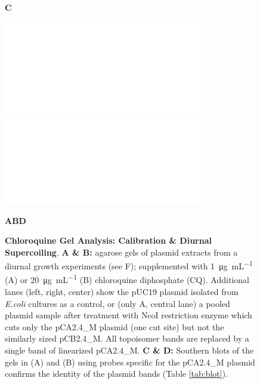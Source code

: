 \documentclass[10pt,a4]{article}
\newcommand{\ugml}{\micro\gram\per\milli\liter}
\begin{document}
\begin{figure}[ht!]
  \vspace{-.5cm}
  \textbf{C}
  \vspace{.25cm}
  
  \begin{minipage}{.49\textwidth}
    \includegraphics[width=\textwidth]{figures/diurnal/20130620_pCA_CQ1.png}
  \end{minipage}
  \begin{minipage}{.49\textwidth}
    \includegraphics[width=\textwidth]{figures/diurnal/20130821_pCA_CQ20.png}
  \end{minipage}
  
  \vspace{-.5cm}
  \textbf{A}\hspace{.32\textwidth}\textbf{B}\hspace{.32\textwidth}\textbf{D}

  \caption{\textbf{Chloroquine Gel Analysis: Calibration \& Diurnal
      Supercoiling}. \small{\textbf{A \& B:} agarose gels of plasmid
      extracts from a diurnal growth experiments (see F); supplemented
      with \SI{1}{\ugml} (A) or \SI{20}{\ugml} (B) chloroquine
      diphosphate (CQ).  Additional lanes (left, right, center) show
      the pUC19 plasmid isolated from \textit{E.coli} cultures as a
      control, or (only A, central lane) a pooled plasmid sample after
      treatment with NcoI restriction enzyme which cuts only the
      pCA2.4\_M plasmid (one cut site) but not the similarly sized
      pCB2.4\_M. All topoisomer bands are replaced by a single band of
      linearized pCA2.4\_M. \textbf{C \& D:} Southern blots of the
      gels in (A) and (B) using probes specific for the pCA2.4\_M
      plasmid confirms the identity of the plasmid bands (Table
      \ref{tab:blot}).}}
    \label{fig:diurnalcq} 
\end{figure}
\end{document}
